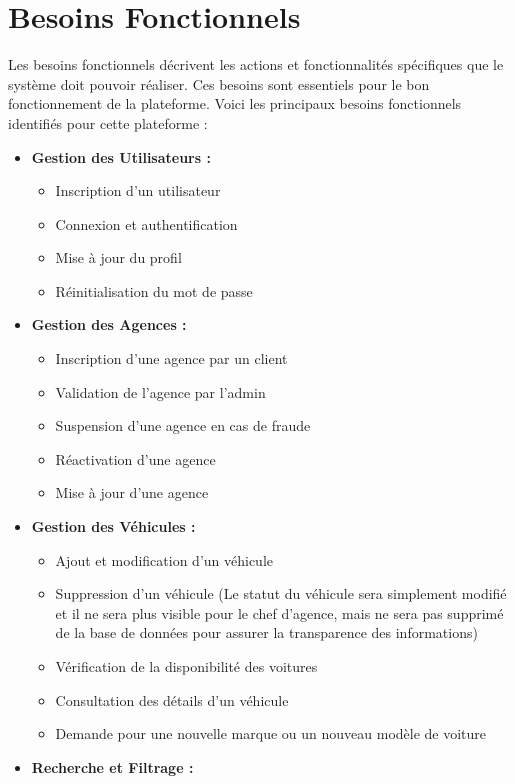 \section{Besoins Fonctionnels}
Les besoins fonctionnels décrivent les actions et fonctionnalités spécifiques que le système doit pouvoir réaliser. Ces besoins sont essentiels pour le bon fonctionnement de la plateforme. Voici les principaux besoins fonctionnels identifiés pour cette plateforme :
\begin{itemize}
    \item \textbf{Gestion des Utilisateurs :}
    \begin{itemize}
        \item Inscription d’un utilisateur
        \item Connexion et authentification
        \item Mise à jour du profil
        \item Réinitialisation du mot de passe
    \end{itemize}
    \item \textbf{Gestion des Agences :}
    \begin{itemize}
        \item Inscription d’une agence par un client
        \item Validation de l’agence par l’admin
        \item Suspension d’une agence en cas de fraude
        \item Réactivation d’une agence
        \item Mise à jour d’une agence
    \end{itemize}
    \item \textbf{Gestion des Véhicules :}
    \begin{itemize}
        \item Ajout et modification d’un véhicule
        \item Suppression d’un véhicule (Le statut du véhicule sera simplement modifié et il ne sera plus visible pour le chef d’agence, mais ne sera pas supprimé de la base de données pour assurer la transparence des informations)
        \item Vérification de la disponibilité des voitures
        \item Consultation des détails d’un véhicule
        \item Demande pour une nouvelle marque ou un nouveau modèle de voiture
    \end{itemize}
    \item \textbf{Recherche et Filtrage :}

\end{itemize}
